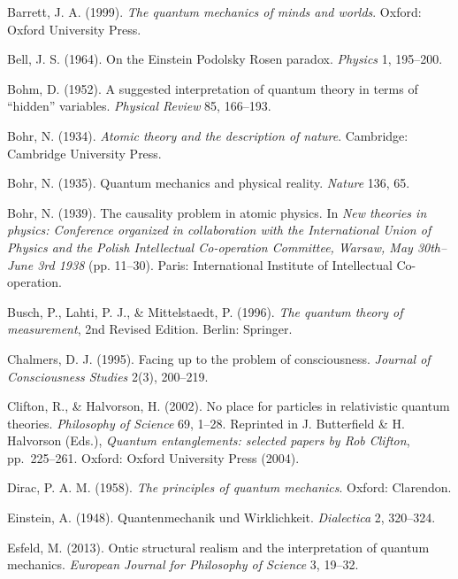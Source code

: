 \begin{thebibliography}{99}

Barrett, J. A. (1999). \emph{The quantum mechanics of minds and worlds}. Oxford: Oxford University Press.

Bell, J. S. (1964). On the Einstein Podolsky Rosen paradox. \emph{Physics} 1, 195--200. 

Bohm, D. (1952). A suggested interpretation of quantum theory in terms
of ``hidden'' variables. \emph{Physical Review} 85, 166--193.

Bohr, N. (1934). \emph{Atomic theory and the description of nature}. Cambridge: Cambridge University Press. 

Bohr, N. (1935). Quantum mechanics and physical reality. \emph{Nature} 136, 65. 

Bohr, N. (1939). The causality problem in atomic physics. In \emph{New theories in physics: Conference organized in collaboration with the International Union of Physics and the Polish Intellectual Co-operation Committee, Warsaw, May 30th--June 3rd 1938} (pp. 11--30). Paris: International Institute of Intellectual Co-operation. 

Busch, P., Lahti, P. J., \& Mittelstaedt, P. (1996). \emph{The quantum theory of measurement}, 2nd Revised Edition. Berlin: Springer. 

Chalmers, D. J. (1995). Facing up to the problem of consciousness. \emph{Journal of Consciousness Studies} 2(3), 200--219. 

Clifton, R., \& Halvorson, H. (2002). No place for particles in relativistic quantum theories. \emph{Philosophy of Science} 69, 1--28. Reprinted in J. Butterfield \& H. Halvorson (Eds.), \emph{Quantum entanglements: selected papers by Rob Clifton}, pp.\ 225--261. Oxford: Oxford University Press (2004).

Dirac, P. A. M. (1958). \emph{The principles of quantum mechanics}. Oxford: Clarendon. 

Einstein, A. (1948). Quantenmechanik und Wirklichkeit. \emph{Dialectica} 2, 320--324.

Esfeld, M. (2013).  Ontic structural realism and the interpretation of quantum mechanics. \emph{European Journal for Philosophy of Science} 3, 19--32. 


\end{thebibliography}
